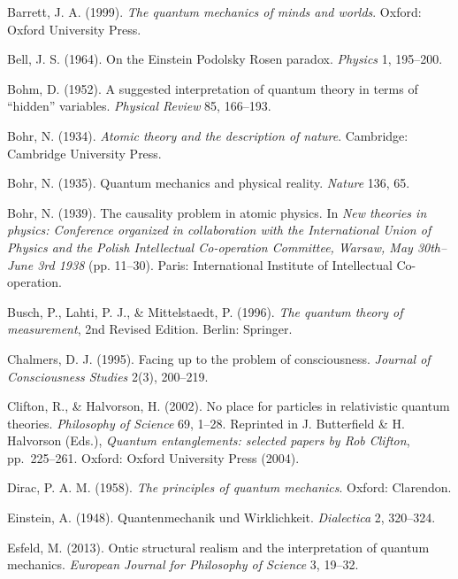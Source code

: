 \begin{thebibliography}{99}

Barrett, J. A. (1999). \emph{The quantum mechanics of minds and worlds}. Oxford: Oxford University Press.

Bell, J. S. (1964). On the Einstein Podolsky Rosen paradox. \emph{Physics} 1, 195--200. 

Bohm, D. (1952). A suggested interpretation of quantum theory in terms
of ``hidden'' variables. \emph{Physical Review} 85, 166--193.

Bohr, N. (1934). \emph{Atomic theory and the description of nature}. Cambridge: Cambridge University Press. 

Bohr, N. (1935). Quantum mechanics and physical reality. \emph{Nature} 136, 65. 

Bohr, N. (1939). The causality problem in atomic physics. In \emph{New theories in physics: Conference organized in collaboration with the International Union of Physics and the Polish Intellectual Co-operation Committee, Warsaw, May 30th--June 3rd 1938} (pp. 11--30). Paris: International Institute of Intellectual Co-operation. 

Busch, P., Lahti, P. J., \& Mittelstaedt, P. (1996). \emph{The quantum theory of measurement}, 2nd Revised Edition. Berlin: Springer. 

Chalmers, D. J. (1995). Facing up to the problem of consciousness. \emph{Journal of Consciousness Studies} 2(3), 200--219. 

Clifton, R., \& Halvorson, H. (2002). No place for particles in relativistic quantum theories. \emph{Philosophy of Science} 69, 1--28. Reprinted in J. Butterfield \& H. Halvorson (Eds.), \emph{Quantum entanglements: selected papers by Rob Clifton}, pp.\ 225--261. Oxford: Oxford University Press (2004).

Dirac, P. A. M. (1958). \emph{The principles of quantum mechanics}. Oxford: Clarendon. 

Einstein, A. (1948). Quantenmechanik und Wirklichkeit. \emph{Dialectica} 2, 320--324.

Esfeld, M. (2013).  Ontic structural realism and the interpretation of quantum mechanics. \emph{European Journal for Philosophy of Science} 3, 19--32. 


\end{thebibliography}
